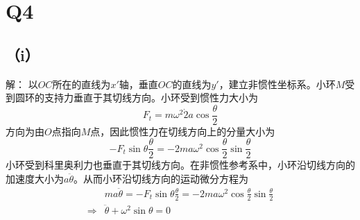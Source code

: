 \documentclass[10pt,a4paper]{article}
\begin{document}
\section*{Q4}
\subsection*{（i）}解：
以$OC$所在的直线为$x'$轴，垂直$OC$的直线为$y'$，建立非惯性坐标系。小环$M$受到圆环的支持力垂直于其切线方向。小环受到惯性力大小为
\[
F_t=m\omega^2\dot2a\cos\frac{\theta}{2}
\]
方向为由$O$点指向$M$点，因此惯性力在切线方向上的分量大小为
\[
-F_t\sin\theta\frac{\theta}{2}=-2ma\omega^2\cos\frac{\theta}{2}\sin\frac{\theta}{2}
\]
小环受到科里奥利力也垂直于其切线方向。在非惯性参考系中，小环沿切线方向的加速度大小为$a\ddot{\theta}$。从而小环沿切线方向的运动微分方程为
\begin{align*}
&ma\ddot{\theta}=-F_t\sin\theta\frac{\theta}{2}=-2ma\omega^2\cos\frac{\theta}{2}\sin\frac{\theta}{2}\\
\Longrightarrow&\ddot{\theta}+\omega^2\sin\theta=0
\end{align*}
\end{document}
